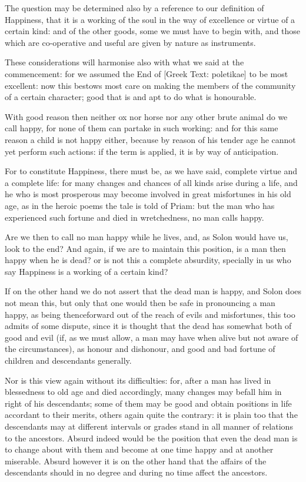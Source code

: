 The question may be determined also by a reference to our definition of
Happiness, that it is a working of the soul in the way of excellence or
virtue of a certain kind: and of the other goods, some we must have to
begin with, and those which are co-operative and useful are given by
nature as instruments.

These considerations will harmonise also with what we said at the
commencement: for we assumed the End of [Greek Text: poletikae] to be
most excellent: now this bestows most care on making the members of the
community of a certain character; good that is and apt to do what is
honourable.

With good reason then neither ox nor horse nor any other brute animal
do we call happy, for none of them can partake in such working: and for
this same reason a child is not happy either, because by reason of his
tender age he cannot yet perform such actions: if the term is applied,
it is by way of anticipation.

For to constitute Happiness, there must be, as we have said, complete
virtue and a complete life: for many changes and chances of all kinds
arise during a life, and he who is most prosperous may become involved
in great misfortunes in his old age, as in the heroic poems the tale is
told of Priam: but the man who has experienced such fortune and died in
wretchedness, no man calls happy.

Are we then to call no man happy while he lives, and, as Solon would
have us, look to the end? And again, if we are to maintain this
position, is a man then happy when he is dead? or is not this a complete
absurdity, specially in us who say Happiness is a working of a certain
kind?

If on the other hand we do not assert that the dead man is happy, and
Solon does not mean this, but only that one would then be safe in
pronouncing a man happy, as being thenceforward out of the reach of
evils and misfortunes, this too admits of some dispute, since it is
thought that the dead has somewhat both of good and evil (if, as we must
allow, a man may have when alive but not aware of the circumstances),
as honour and dishonour, and good and bad fortune of children and
descendants generally.

Nor is this view again without its difficulties: for, after a man has
lived in blessedness to old age and died accordingly, many changes may
befall him in right of his descendants; some of them may be good and
obtain positions in life accordant to their merits, others again quite
the contrary: it is plain too that the descendants may at different
intervals or grades stand in all manner of relations to the ancestors.
Absurd indeed would be the position that even the dead man is to change
about with them and become at one time happy and at another miserable.
Absurd however it is on the other hand that the affairs of the
descendants should in no degree and during no time affect the ancestors.

